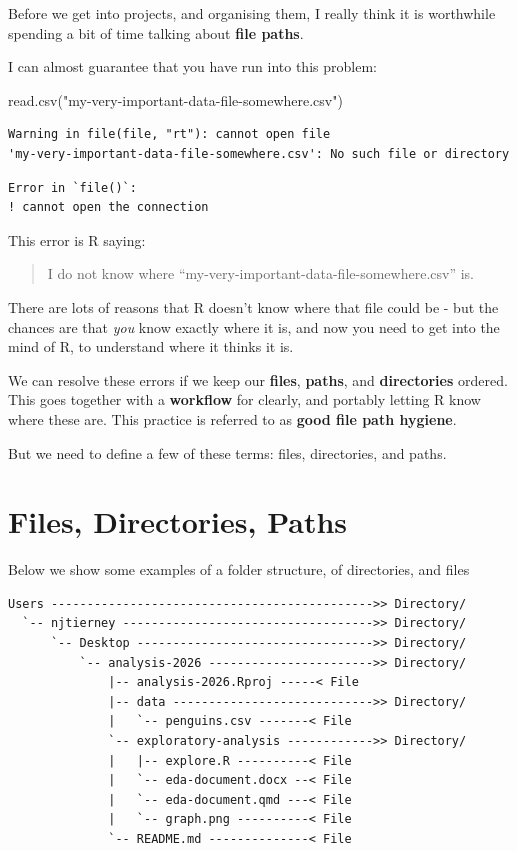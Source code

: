 \documentclass[
  letterpaper,
  justified,
  a4paper]{tufte-book}
\makeatletter
\newenvironment{Shaded}{\begin{snugshade}}{\end{snugshade}}
\newcommand{\FunctionTok}[1]{\textcolor[rgb]{0.28,0.35,0.67}{#1}}
\newcommand{\NormalTok}[1]{\textcolor[rgb]{0.00,0.23,0.31}{#1}}
\newcommand{\StringTok}[1]{\textcolor[rgb]{0.13,0.47,0.30}{#1}}
\let\rbporigShaded\Shaded
\let\rbporigendShaded\endShaded
\renewenvironment{Shaded}{%
  \begingroup
  \ifdim\linewidth=\rbpbodywidth
    \advance\linewidth by \@tufte@overhang
    \advance\hsize by \@tufte@overhang
    \advance\columnwidth by \@tufte@overhang
  \fi
  \rbporigShaded
}{%
  \rbporigendShaded
  \endgroup
}
\makeatother
\begin{document}
Before we get into projects, and organising them, I really think it is
worthwhile spending a bit of time talking about \textbf{file paths}.

I can almost guarantee that you have run into this problem:

\begin{Shaded}
\begin{Highlighting}[]
\FunctionTok{read.csv}\NormalTok{(}\StringTok{"my{-}very{-}important{-}data{-}file{-}somewhere.csv"}\NormalTok{)}
\end{Highlighting}
\end{Shaded}

\begin{verbatim}
Warning in file(file, "rt"): cannot open file
'my-very-important-data-file-somewhere.csv': No such file or directory
\end{verbatim}

\begin{verbatim}
Error in `file()`:
! cannot open the connection
\end{verbatim}

This error is R saying:

\begin{quote}
I do not know where ``my-very-important-data-file-somewhere.csv'' is.
\end{quote}

There are lots of reasons that R doesn't know where that file could be -
but the chances are that \emph{you} know exactly where it is, and now
you need to get into the mind of R, to understand where it thinks it is.

We can resolve these errors if we keep our \textbf{files},
\textbf{paths}, and \textbf{directories} ordered. This goes together
with a \textbf{workflow} for clearly, and portably letting R know where
these are. This practice is referred to as \textbf{good file path
hygiene}.

But we need to define a few of these terms: files, directories, and
paths.

\section{Files, Directories, Paths}\label{files-directories-paths}

Below we show some examples of a folder structure, of directories, and
files

\begin{verbatim}
Users --------------------------------------------->> Directory/
  `-- njtierney ----------------------------------->> Directory/
      `-- Desktop --------------------------------->> Directory/
          `-- analysis-2026 ----------------------->> Directory/
              |-- analysis-2026.Rproj -----< File
              |-- data ---------------------------->> Directory/
              |   `-- penguins.csv -------< File
              `-- exploratory-analysis ------------>> Directory/
              |   |-- explore.R ----------< File
              |   `-- eda-document.docx --< File
              |   `-- eda-document.qmd ---< File
              |   `-- graph.png ----------< File
              `-- README.md --------------< File
\end{verbatim}
\end{document}
